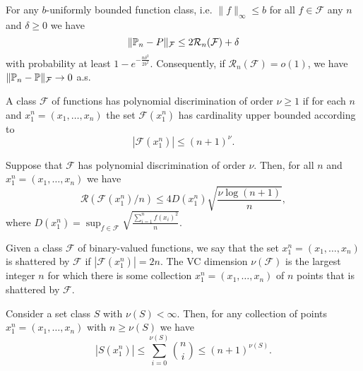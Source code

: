 \begin{boxtheorem}[]
    For any $b$-uniformly bounded function class,
    i.e. $\|f\|_\infty\leq b$ for all $f\in\mathcal{F}$
    any $n$ and $\delta\geq0$ we have 
    $$
    \|\P_n-P\|_\mathcal{F}\leq 
    2\mathcal{R}_n(\mathcal{F}) + \delta$$
    with probability at least 
    $1-e^{-\frac{n\delta^2}{2b^2}}.$ Consequently, if
    $\mathcal{R}_n(\mathcal{F})=o(1)$, we have 
    $\|\P_n-\P\|_\mathcal{F}\to0$ a.s.
\end{boxtheorem}

\begin{boxdefinition}
    A class $\mathcal{F}$ of functions has polynomial
    discrimination of order $\nu\geq1$ if for each
    $n$ and $x_1^n=(x_1,\dots,x_n)$ the set 
    $\mathcal{F}(x_1^n)$ has cardinality upper bounded 
    according to 
    $$
    |\mathcal{F}(x_1^n)|\leq (n+1)^\nu.
    $$
\end{boxdefinition}

\begin{boxtheorem}[]
    Suppose that $\mathcal{F}$ has polynomial discrimination
    of order $\nu$. Then, for all $n$ and 
    $x_1^n=(x_1,\dots,x_n)$ we have 
    $$
    \mathcal{R}(\mathcal{F}(x_1^n)/n)
    \leq 4D(x_1^n)\sqrt{\frac{\nu\log(n+1)}{n}},
    $$
    where $D(x_1^n)=\sup_{f\in\mathcal{F}}
    \sqrt{\frac{\sum_{i=1}^nf(x_i)^2}{n}}$.
\end{boxtheorem}

\begin{boxdefinition}[VC Dimension]
    Given a class $\mathcal{F}$
     of binary-valued functions, we
    say that the set
    $x^n_1 = (x_1 , \dots, x_n )$
     is shattered by $\mathcal{F}$
      if $|\mathcal{F}(x^n_1 )| = 2n$.
    The VC dimension $\nu(\mathcal{F})$
    is the largest integer $n$ for which there 
    is some collection $x^n_1 = (x_1 , \dots , x_n )$
     of $n$ points that is shattered by $\mathcal{F}$.
\end{boxdefinition}

\begin{boxtheorem}
    Consider a set class $S$ with $\nu(S) < \infty.$
    Then, for any collection of points 
    $x_1^n = (x_1 , \dots , x_n )$ with $n\geq\nu(S)$
    we have 
    $$
    |S(x_1^n)|\leq\sum_{i=0}^{\nu(S)}\binom{n}{i}
    \leq (n+1)^{\nu(S)}.$$

\end{boxtheorem}